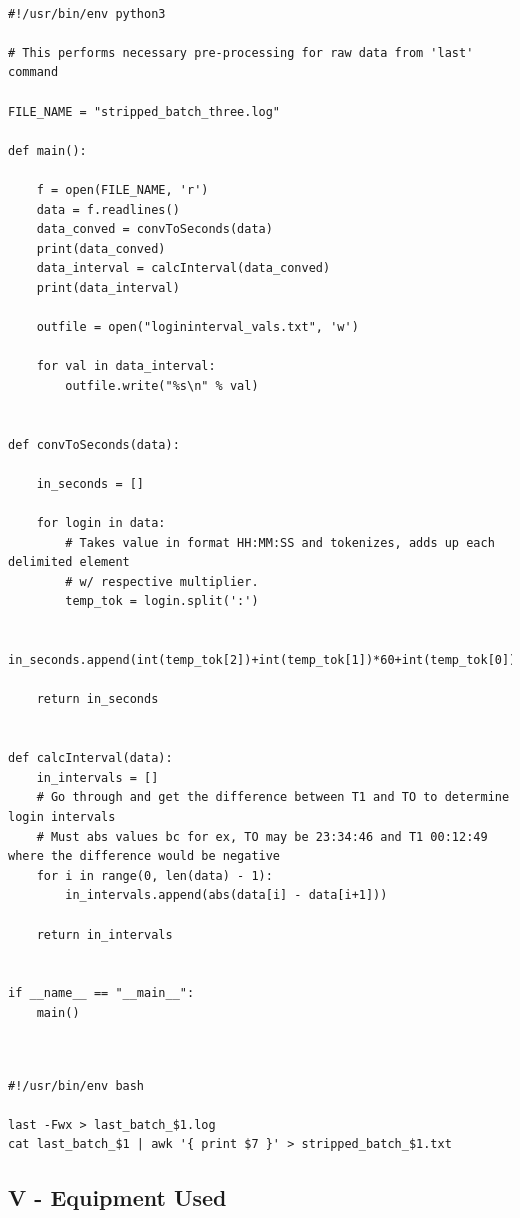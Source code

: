 \documentclass[10pt]{report}
\begin{document}
\begin{lstlisting}

#!/usr/bin/env python3

# This performs necessary pre-processing for raw data from 'last' command

FILE_NAME = "stripped_batch_three.log"

def main():

	f = open(FILE_NAME, 'r')
	data = f.readlines()
	data_conved = convToSeconds(data)
	print(data_conved)
	data_interval = calcInterval(data_conved)
	print(data_interval)

	outfile = open("logininterval_vals.txt", 'w')

	for val in data_interval:
		outfile.write("%s\n" % val)


def convToSeconds(data):

	in_seconds = []

	for login in data:
		# Takes value in format HH:MM:SS and tokenizes, adds up each delimited element
		# w/ respective multiplier.
		temp_tok = login.split(':')

		in_seconds.append(int(temp_tok[2])+int(temp_tok[1])*60+int(temp_tok[0])*3600)

	return in_seconds


def calcInterval(data):
	in_intervals = []
	# Go through and get the difference between T1 and TO to determine login intervals
	# Must abs values bc for ex, TO may be 23:34:46 and T1 00:12:49 where the difference would be negative
	for i in range(0, len(data) - 1):
		in_intervals.append(abs(data[i] - data[i+1]))

	return in_intervals


if __name__ == "__main__":
	main()


\end{lstlisting}




\lstset{language=Bash}

\begin{lstlisting}

#!/usr/bin/env bash

last -Fwx > last_batch_$1.log
cat last_batch_$1 | awk '{ print $7 }' > stripped_batch_$1.txt

\end{lstlisting}



\subsection*{V - Equipment Used}
\end{document}
